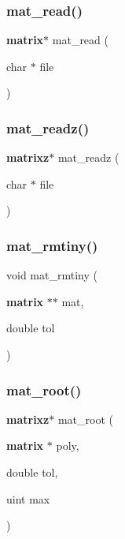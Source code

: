 \mbox{\label{mat_lib_8h_a0df59a37604356a87b9073ec0df676ad}} 
\subsubsection{mat\+\_\+read()}
{\footnotesize\ttfamily \textbf{ matrix}$\ast$ mat\+\_\+read (\begin{DoxyParamCaption}\item[{char $\ast$}]{file }\end{DoxyParamCaption})}

\mbox{\label{mat_lib_8h_a5a206978460ad93affafd7d141084692}} 
\subsubsection{mat\+\_\+readz()}
{\footnotesize\ttfamily \textbf{ matrixz}$\ast$ mat\+\_\+readz (\begin{DoxyParamCaption}\item[{char $\ast$}]{file }\end{DoxyParamCaption})}

\mbox{\label{mat_lib_8h_a7b08ea60e7c624ca7db5b4006f9407f9}} 
\subsubsection{mat\+\_\+rmtiny()}
{\footnotesize\ttfamily void mat\+\_\+rmtiny (\begin{DoxyParamCaption}\item[{\textbf{ matrix} $\ast$$\ast$}]{mat,  }\item[{double}]{tol }\end{DoxyParamCaption})}

\mbox{\label{mat_lib_8h_ab4b0c732e449ec94424047f3f3752735}} 
\subsubsection{mat\+\_\+root()}
{\footnotesize\ttfamily \textbf{ matrixz}$\ast$ mat\+\_\+root (\begin{DoxyParamCaption}\item[{\textbf{ matrix} $\ast$}]{poly,  }\item[{double}]{tol,  }\item[{uint}]{max }\end{DoxyParamCaption})}

